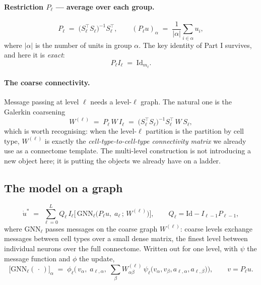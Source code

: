 \documentclass[11pt,a4paper]{article}
\newcommand{\Id}{\mathrm{Id}}
\begin{document}
\paragraph{Restriction $P_\ell$ --- average over each group.}
\begin{equation}
P_\ell \;=\; \big(S_\ell^{\!\top} S_\ell\big)^{-1} S_\ell^{\!\top} ,
\qquad
(P_\ell u)_\alpha \;=\; \frac{1}{|\alpha|}\sum_{i \in \alpha} u_i ,
\label{eq:grestrict}
\end{equation}
where $|\alpha|$ is the number of units in group $\alpha$. The key identity of Part I
survives, and here it is \emph{exact}:
\begin{equation}
P_\ell I_\ell \;=\; \Id_{m_\ell} .
\label{eq:gPI}
\end{equation}

\paragraph{The coarse connectivity.} Message passing at level $\ell$ needs a level-$\ell$
graph. The natural one is the Galerkin coarsening
\begin{equation}
W^{(\ell)} \;=\; P_\ell\, W\, I_\ell
\;=\; \big(S_\ell^{\!\top}S_\ell\big)^{-1} S_\ell^{\!\top}\, W\, S_\ell ,
\label{eq:coarseW}
\end{equation}
which is worth recognising: when the level-$\ell$ partition is the partition by cell type,
$W^{(\ell)}$ is exactly the \emph{cell-type-to-cell-type connectivity matrix} we already
use as a connectome template. The multi-level construction is not introducing a new object
here; it is putting the objects we already have on a ladder.

\subsection{The model on a graph}

\begin{equation}
\boxed{\;
\dot u^{*} \;=\; \sum_{\ell=0}^{L}
Q_\ell\, I_\ell
\Big[\, \mathrm{GNN}_\ell\big(P_\ell u,\; a_\ell \,;\, W^{(\ell)}\big) \Big] ,
\qquad Q_\ell = \Id - I_{\ell-1}P_{\ell-1} ,
\;}
\label{eq:gmodel}
\end{equation}
where $\mathrm{GNN}_\ell$ passes messages on the coarse graph $W^{(\ell)}$: coarse levels
exchange messages between cell types over a small dense matrix, the finest level between
individual neurons over the full connectome. Written out for one level, with $\psi$ the
message function and $\phi$ the update,
\begin{equation}
\big[\mathrm{GNN}_\ell(\,\cdot\,)\big]_\alpha
\;=\;
\phi_\ell\Big(\, v_\alpha,\; a_{\ell,\alpha},\;
   \textstyle\sum_{\beta} W^{(\ell)}_{\alpha\beta}\,
   \psi_\ell\big(v_\alpha, v_\beta, a_{\ell,\alpha}, a_{\ell,\beta}\big) \Big),
\qquad v = P_\ell u .
\label{eq:gmessage}
\end{equation}
\end{document}
